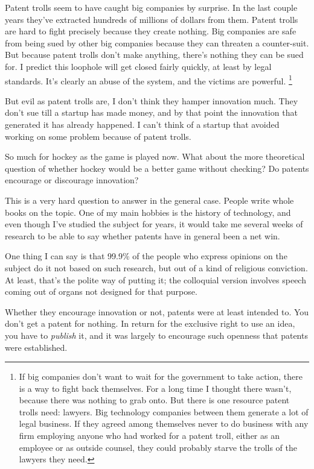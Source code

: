 \documentclass[12pt]{book}
\begin{document}
Patent trolls seem to have caught big companies by surprise. In the last
couple years they've extracted hundreds of millions of dollars from
them. Patent trolls are hard to fight precisely because they create
nothing. Big companies are safe from being sued by other big companies
because they can threaten a counter-suit. But because patent trolls
don't make anything, there's nothing they can be sued for. I predict
this loophole will get closed fairly quickly, at least by legal
standards. It's clearly an abuse of the system, and the victims are
powerful. \footnote{If big companies don't want to wait for the government to take
action, there is a way to fight back themselves. For a long time I
thought there wasn't, because there was nothing to grab onto. But there
is one resource patent trolls need: lawyers. Big technology companies
between them generate a lot of legal business. If they agreed among
themselves never to do business with any firm employing anyone who had
worked for a patent troll, either as an employee or as outside counsel,
they could probably starve the trolls of the lawyers they need.}

But evil as patent trolls are, I don't think they hamper innovation
much. They don't sue till a startup has made money, and by that point
the innovation that generated it has already happened. I can't think of
a startup that avoided working on some problem because of patent trolls.

So much for hockey as the game is played now. What about the more
theoretical question of whether hockey would be a better game without
checking? Do patents encourage or discourage innovation?

This is a very hard question to answer in the general case. People write
whole books on the topic. One of my main hobbies is the history of
technology, and even though I've studied the subject for years, it would
take me several weeks of research to be able to say whether patents have
in general been a net win.

One thing I can say is that 99.9\% of the people who express opinions on
the subject do it not based on such research, but out of a kind of
religious conviction. At least, that's the polite way of putting it; the
colloquial version involves speech coming out of organs not designed for
that purpose.

Whether they encourage innovation or not, patents were at least intended
to. You don't get a patent for nothing. In return for the exclusive
right to use an idea, you have to \emph{publish} it, and it was largely
to encourage such openness that patents were established.
\end{document}
